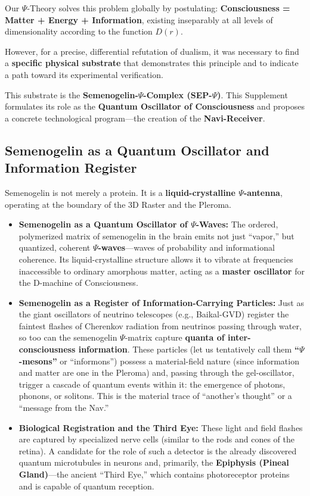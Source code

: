 \documentclass[a4paper,12pt]{article}
\begin{document}
	Our $\Psi$-Theory solves this problem globally by postulating:
	\textbf{Consciousness = Matter + Energy + Information}, existing inseparably at all levels of dimensionality according to the function $D(r)$.
	
	However, for a precise, differential refutation of dualism, it was necessary to find a \textbf{specific physical substrate} that demonstrates this principle and to indicate a path toward its experimental verification.
	
	This substrate is the \textbf{Semenogelin-$\Psi$-Complex (SEP-$\Psi$)}. This Supplement formulates its role as the \textbf{Quantum Oscillator of Consciousness} and proposes a concrete technological program---the creation of the \textbf{Navi-Receiver}.
	
	\subsection{Semenogelin as a Quantum Oscillator and Information Register}
	
	Semenogelin is not merely a protein. It is a \textbf{liquid-crystalline $\Psi$-antenna}, operating at the boundary of the 3D Raster and the Pleroma.
	
	\begin{itemize}
		\item \textbf{Semenogelin as a Quantum Oscillator of $\Psi$-Waves:} The ordered, polymerized matrix of semenogelin in the brain emits not just ``vapor,'' but quantized, coherent \textbf{$\Psi$-waves}---waves of probability and informational coherence. Its liquid-crystalline structure allows it to vibrate at frequencies inaccessible to ordinary amorphous matter, acting as a \textbf{master oscillator} for the D-machine of Consciousness.
		
		\item \textbf{Semenogelin as a Register of Information-Carrying Particles:} Just as the giant oscillators of neutrino telescopes (e.g., Baikal-GVD) register the faintest flashes of Cherenkov radiation from neutrinos passing through water, so too can the semenogelin $\Psi$-matrix capture \textbf{quanta of inter-consciousness information}. These particles (let us tentatively call them \textbf{``$\Psi$-mesons''} or ``informons'') possess a material-field nature (since information and matter are one in the Pleroma) and, passing through the gel-oscillator, trigger a cascade of quantum events within it: the emergence of photons, phonons, or solitons. This is the material trace of ``another's thought'' or a ``message from the Nav.''
		
		\item \textbf{Biological Registration and the Third Eye:} These light and field flashes are captured by specialized nerve cells (similar to the rods and cones of the retina). A candidate for the role of such a detector is the already discovered quantum microtubules in neurons and, primarily, the \textbf{Epiphysis (Pineal Gland)}---the ancient ``Third Eye,'' which contains photoreceptor proteins and is capable of quantum reception.
	\end{itemize}
	
\end{document}
